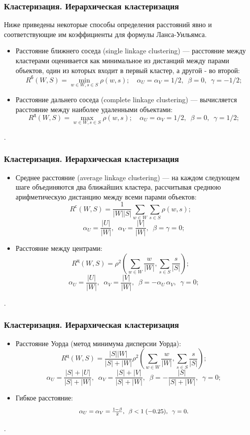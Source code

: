 \documentclass[ucs, notheorems, handout]{beamer}
\begin{document}
	\begin{frame}
	\frametitle{Кластеризация. Иерархическая кластеризация}
	
	Ниже приведены некоторые способы определения расстояний явно и соответствующие им коэффициенты для формулы Ланса-Уильямса. 
\begin{itemize}
	\item Расстояние ближнего соседа (single linkage clustering) --- расстояние между кластерами оценивается как минимальное из дистанций между парами объектов, один из которых входит в первый кластер, а другой - во второй:
	$$R^{\text{б}}(W, S) = \min_{w \in W, s \in S} \rho(w, s); \quad \alpha_U=\alpha_V=1/2,\enspace \beta=0,\enspace \gamma=-1/2;$$
	\item Расстояние дальнего соседа (complete linkage clustering) --- вычисляется расстояние между наиболее удаленными объектами:
	$$R^{\text{д}}(W, S) = \max_{w \in W, s \in S} \rho(w, s); \quad \alpha_U=\alpha_V=1/2,\enspace \beta=0,\enspace \gamma=1/2;$$
\end{itemize}.
	\end{frame}
	
	\begin{frame}
	\frametitle{Кластеризация. Иерархическая кластеризация}
	
\begin{itemize}
	
	\item Среднее расстояние (average linkage clustering) --- на каждом следующем шаге объединяются два ближайших кластера, рассчитывая среднюю арифметическую дистанцию между всеми парами объектов:
	$$R^{\text{с}}(W, S) = \frac{1}{ |W| |S| } \sum_{w \in W} \sum_{s \in S} \rho(w, s); \quad $$ $$ \alpha_U=\frac{|U|}{|W|},\enspace \alpha_V=\frac{|V|}{|W|},\enspace \beta=\gamma=0;$$
	
	\item Расстояние между центрами:
	$$R^{\text{ц}}(W, S) = \rho^2 \left( \sum_{w \in W} \frac{w}{|W|}, \sum_{s \in S} \frac{s}{|S|}\right); \quad
	$$ $$\alpha_U=\frac{|U|}{|W|},\enspace \alpha_V=\frac{|V|}{|W|},\enspace \beta= -\alpha_U \,\alpha_V,\enspace \gamma=0;$$
	
\end{itemize}.
	\end{frame}
	
	\begin{frame}
	\frametitle{Кластеризация. Иерархическая кластеризация}
	
\begin{itemize}
	\item Расстояние Уорда (метод минимума дисперсии Уорда):
	$$R^{\text{ц}}(W, S) = \frac{|S| |W|}{|S| + |W|} \rho^2 \left( \sum_{w \in W} \frac{w}{|W|}, \sum_{s \in S} \frac{s}{|S|}\right);$$  
	$$\alpha_U=\frac{|S|+|U|}{|S|+|W|},\enspace \alpha_V=\frac{|S|+|V|}{|S|+|W|},\enspace \beta= -\frac{|S|}{|S|+|W|},\enspace \gamma=0;$$
	
	\item Гибкое расстояние: $$\scalebox{0.9}{$\alpha_U=\alpha_V=\frac{1-\beta}{2},\enspace \beta<1 \;(-0.25),\enspace \gamma=0$}.$$
\end{itemize}.
	\end{frame}
	
\end{document}
